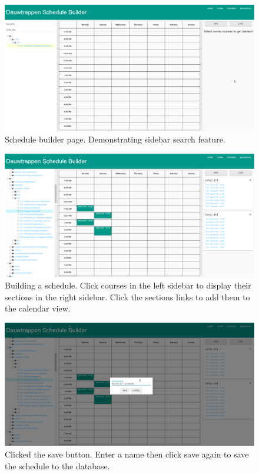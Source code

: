 \documentclass[twoside=false,a4paper,11pt]{article}
\theoremstyle{mytheor}
\begin{document}
\begin{figure}[h!]
	\includegraphics[width=\textwidth]{scheduleSearch.png}
	\caption{Schedule builder page. Demonstrating sidebar search feature.}
\end{figure}
\begin{figure}[h!]
	\includegraphics[width=\textwidth]{scheduleCourses.png}
	\caption{Building a schedule. Click courses in the left sidebar to display their sections in the right sidebar. Click the sections links to add them to the calendar view.}
\end{figure}
\begin{figure}[h!]
	\includegraphics[width=\textwidth]{scheduleSave.png}
	\caption{Clicked the save button. Enter a name then click save again to save the schedule to the database.}
\end{figure}
\end{document}
